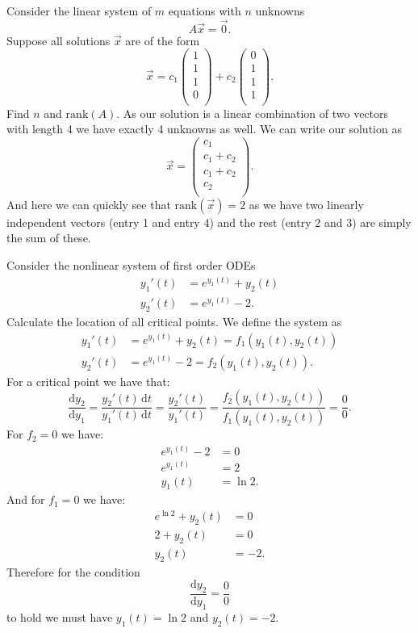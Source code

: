 \documentclass[a4paper]{article}
\begin{document}
Consider the linear system of $m$ equations with $n$ unknowns
\[ 
A \Vec{x} = \Vec{0}
.\]
Suppose all solutions $\Vec{x}$ are of the form
\[ 
\Vec{x} = c_1 \begin{pmatrix}
1\\
1\\
1\\
0\\
\end{pmatrix} + c_2 \begin{pmatrix}
0\\
1\\
1\\
1\\
\end{pmatrix}
.\]
Find $n$ and $\mathrm{rank}(A)$.
\bigbreak
As our solution is a linear combination of two vectors with length 4 we have exactly 4 unknowns as well. We can write our solution as
\[ 
\Vec{x} = \begin{pmatrix}
c_1 \\
c_1 + c_2 \\
c_1 + c_2\\
c_2 \\
\end{pmatrix}
.\]
And here we can quickly see that $\mathrm{rank}(\Vec{x}) = 2$ as we have two linearly independent vectors (entry 1 and entry 4) and the rest (entry 2 and 3) are simply the sum of these.


Consider the nonlinear system of first order ODEs
\begin{align*}
  y_1'(t) &= e^{y_1(t)} + y_2(t) \\
  y_2'(t) &= e^{y_1(t)} -2
.\end{align*}
Calculate the location of all critical points.
\bigbreak
We define the system as
\begin{align*}
  y_1'(t) &= e^{y_1(t)} + y_2(t) = f_1(y_1(t), y_2(t)) \\
  y_2'(t) &= e^{y_1(t)} - 2 = f_2(y_1(t), y_2(t))
.\end{align*}
For a critical point we have that:
\[ 
\frac{\mathrm{d}y_2}{\mathrm{d}y_1} = \frac{y_2'(t) \, \mathrm{d}t}{y_1'(t) \, \mathrm{d}t } = \frac{y_2'(t)}{y_1'(t)} = \frac{f_2(y_1(t), y_2(t))}{f_1(y_1(t), y_2(t))} = \frac{0}{0}
.\]
For $f_2 = 0$ we have:
\begin{align*}
  e^{y_1(t)} - 2 &= 0 \\
  e^{y_1(t)} &= 2 \\
  y_1(t) &= \ln 2
.\end{align*}
And for $f_1 = 0$ we have:
\begin{align*}
  e^{\ln 2} + y_2(t) &= 0 \\
  2 + y_2(t) &= 0 \\
  y_2(t) &= -2
.\end{align*}
Therefore for the condition
\[ 
\frac{\mathrm{d}y_2}{\mathrm{d}y_1} = \frac{0}{0}
\]
to hold we must have $y_1(t) = \ln 2$ and $y_2(t) = -2$.
\end{document}
